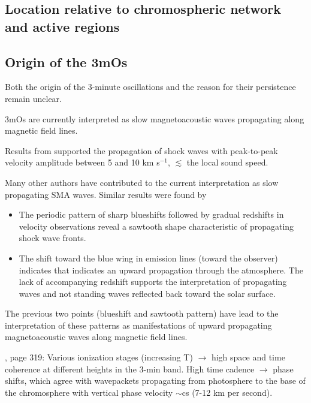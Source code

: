 \subsection{Location relative to chromospheric network and active regions}


\subsection{Origin of the 3mOs}

Both the origin of the 3-minute oscillations and the reason for their
persistence remain unclear.

3mOs are currently interpreted as slow
magnetoacoustic waves propagating along magnetic field lines.

Results from \cite{Tian2014} supported the propagation of shock waves with peak-to-peak
velocity amplitude between 5 and 10 km s$^{-1}$,
$\lesssim$ the local sound speed.

Many other authors have contributed to the
current interpretation as slow propagating SMA waves.
Similar results were found by
\cite{
    Brynildsen1999b,
    Brynildsen2002,
    Brynildsen2004,
    Maltby1999,
    OShea2002,
    DeMoortel2000,
    Reznikova2012
}


\begin{itemize}
    \item The periodic pattern of
        sharp blueshifts followed by gradual redshifts
        in velocity observations reveal a
        sawtooth shape characteristic of propagating shock wave fronts.
    \item The shift toward the blue wing in emission lines (toward the
        observer) indicates that indicates an upward propagation through the
        atmosphere. The lack of accompanying redshift supports the
        interpretation of propagating waves and not standing waves reflected
        back toward the solar surface.
\end{itemize}

The previous two points (blueshift and sawtooth pattern)
have lead to
the interpretation of these patterns as manifestations of upward
propagating magnetoacoustic waves along magnetic field lines.



\cite{Bogdan2006}, page 319:
Various ionization stages (increasing T) $\rightarrow$ high space and time
coherence at different heights in the 3-min band.
High time cadence
$\rightarrow$ phase shifts, which agree with wavepackets propagating from
photosphere to the base of the chromosphere with vertical phase velocity
$\sim$cs (7-12 km per second).


